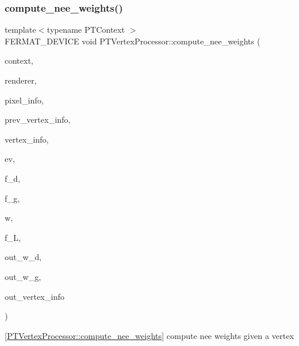 \subsubsection{\texorpdfstring{compute\+\_\+nee\+\_\+weights()}{compute\_nee\_weights()}}
{\footnotesize\ttfamily template$<$typename P\+T\+Context $>$ \\
F\+E\+R\+M\+A\+T\+\_\+\+D\+E\+V\+I\+CE void P\+T\+Vertex\+Processor\+::compute\+\_\+nee\+\_\+weights (\begin{DoxyParamCaption}\item[{const P\+T\+Context \&}]{context,  }\item[{const \hyperlink{struct_rendering_context_view}{Rendering\+Context\+View} \&}]{renderer,  }\item[{const \hyperlink{union_pixel_info}{Pixel\+Info}}]{pixel\+\_\+info,  }\item[{const uint32}]{prev\+\_\+vertex\+\_\+info,  }\item[{const uint32}]{vertex\+\_\+info,  }\item[{const \hyperlink{struct_eye_vertex}{Eye\+Vertex} \&}]{ev,  }\item[{const \hyperlink{structcugar_1_1_vector}{cugar\+::\+Vector3f} \&}]{f\+\_\+d,  }\item[{const \hyperlink{structcugar_1_1_vector}{cugar\+::\+Vector3f} \&}]{f\+\_\+g,  }\item[{const \hyperlink{structcugar_1_1_vector}{cugar\+::\+Vector3f} \&}]{w,  }\item[{const \hyperlink{structcugar_1_1_vector}{cugar\+::\+Vector3f} \&}]{f\+\_\+L,  }\item[{\hyperlink{structcugar_1_1_vector}{cugar\+::\+Vector3f} \&}]{out\+\_\+w\+\_\+d,  }\item[{\hyperlink{structcugar_1_1_vector}{cugar\+::\+Vector3f} \&}]{out\+\_\+w\+\_\+g,  }\item[{uint32 \&}]{out\+\_\+vertex\+\_\+info }\end{DoxyParamCaption})\hspace{0.3cm}{\ttfamily [inline]}}

\mbox{[}\hyperlink{struct_p_t_vertex_processor_acca5b26b69481a1fada796bac4588b9b}{P\+T\+Vertex\+Processor\+::compute\+\_\+nee\+\_\+weights}\mbox{]} compute nee weights given a vertex


